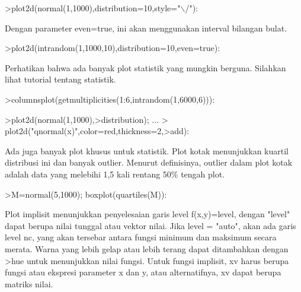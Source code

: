 \documentclass{article}
\begin{document}
\begin{eulernotebook}
\begin{eulercomment}
\begin{eulercomment}
\begin{eulercomment}
\begin{eulercomment}
\begin{eulercomment}
\begin{eulercomment}
\begin{eulerprompt}
>plot2d(normal(1,1000),distribution=10,style="\(\backslash\)/"):
\end{eulerprompt}
\begin{eulercomment}
Dengan  parameter  even=true,  ini  akan  menggunakan  interval
bilangan bulat.
\end{eulercomment}
\begin{eulerprompt}
>plot2d(intrandom(1,1000,10),distribution=10,even=true):
\end{eulerprompt}
\begin{eulercomment}
Perhatikan  bahwa  ada  banyak  plot  statistik  yang  mungkin
berguna. Silahkan  lihat  tutorial  tentang  statistik.
\end{eulercomment}
\begin{eulerprompt}
>columnsplot(getmultiplicities(1:6,intrandom(1,6000,6))):
\end{eulerprompt}
\begin{eulerprompt}
>plot2d(normal(1,1000),>distribution); ...
>  plot2d("qnormal(x)",color=red,thickness=2,>add):
\end{eulerprompt}
\begin{eulercomment}
Ada  juga  banyak  plot  khusus  untuk  statistik.  Plot  kotak
menunjukkan  kuartil  distribusi  ini  dan  banyak  outlier.  Menurut
definisinya, outlier  dalam  plot  kotak  adalah  data  yang  melebihi
1,5  kali  rentang  50\%  tengah  plot.
\end{eulercomment}
\begin{eulerprompt}
>M=normal(5,1000); boxplot(quartiles(M)):
\end{eulerprompt}
\begin{eulercomment}
Plot  implisit  menunjukkan  penyelesaian  garis  level  f(x,y)=level,
dengan  "level"  dapat  berupa  nilai  tunggal  atau  vektor  nilai.
Jika  level  =  "auto",  akan  ada  garis  level  nc,  yang  akan
tersebar  antara  fungsi  minimum  dan  maksimum  secara  merata.
Warna yang  lebih  gelap  atau  lebih  terang  dapat  ditambahkan
dengan  \textgreater{}hue  untuk  menunjukkan  nilai  fungsi.  Untuk  fungsi
implisit,  xv  harus  berupa  fungsi  atau  ekspresi parameter  x  dan
y,  atau  alternatifnya,  xv  dapat  berupa  matriks  nilai.


\end{eulercomment}
\end{eulercomment}
\end{eulercomment}
\end{eulercomment}
\end{eulercomment}
\end{eulercomment}
\end{eulercomment}
\end{eulernotebook}
\end{document}
